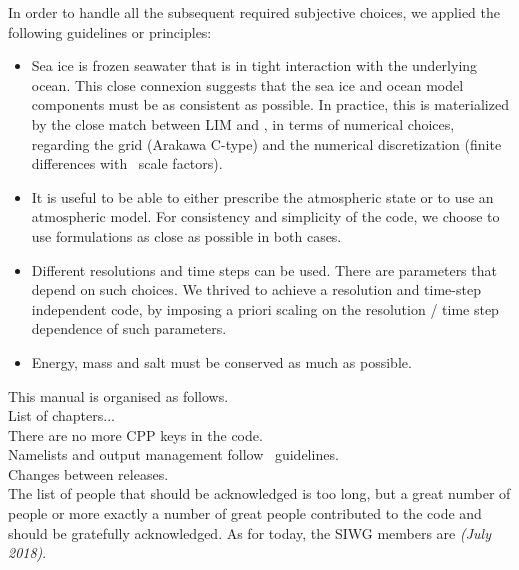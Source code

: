 In order to handle all the subsequent required subjective choices, we applied the following guidelines or principles:
\begin{itemize}
\item Sea ice is frozen seawater that is in tight interaction with the underlying ocean. This close connexion suggests that the sea ice and ocean model components must be as consistent as possible. In practice, this is materialized by the close match between LIM and \NEMO, in terms of numerical choices, regarding the grid (Arakawa C-type) and the numerical discretization (finite differences with \NEMO\ scale factors).
\item It is useful to be able to either prescribe the atmospheric state or to use an atmospheric model. For consistency and simplicity of the code, we choose to use formulations as close as possible in both cases.
\item Different resolutions and time steps can be used. There are parameters that depend on such choices. We thrived to achieve a resolution and time-step independent code, by imposing a priori scaling on the resolution / time step dependence of such parameters.
\item Energy, mass and salt must be conserved as much as possible.
\end{itemize}

This manual is organised as follows. \\

List of chapters... \\

There are no more CPP keys in the code. \\

Namelists and output management follow \NEMO\ guidelines. \\

Changes between releases. \\

The list of people that should be acknowledged is too long, but a great number of people or more exactly a number of great people contributed to the code and should be gratefully acknowledged. As for today,
the SIWG members are \textit{(July 2018)}.

